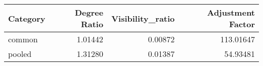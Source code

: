 \captionsetup[table]{labelformat=empty,skip=1pt}
\begin{longtable}{lrrr}
\toprule
Category & Degree Ratio & Visibility\_ratio & Adjustment Factor \\ 
\midrule
common & 1.01442 & 0.00872 & 113.01647 \\ 
pooled & 1.31280 & 0.01387 & 54.93481 \\ 
\bottomrule
\end{longtable}


